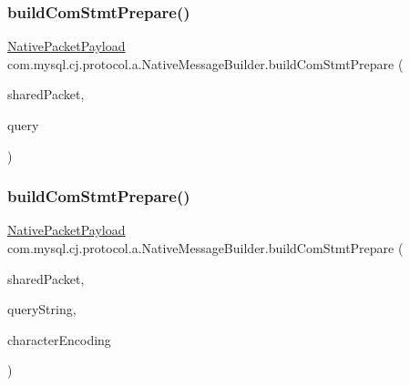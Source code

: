 \subsubsection{\texorpdfstring{build\+Com\+Stmt\+Prepare()}{buildComStmtPrepare()}\hspace{0.1cm}{\footnotesize\ttfamily [1/2]}}
{\footnotesize\ttfamily \mbox{\hyperlink{classcom_1_1mysql_1_1cj_1_1protocol_1_1a_1_1_native_packet_payload}{Native\+Packet\+Payload}} com.\+mysql.\+cj.\+protocol.\+a.\+Native\+Message\+Builder.\+build\+Com\+Stmt\+Prepare (\begin{DoxyParamCaption}\item[{\mbox{\hyperlink{classcom_1_1mysql_1_1cj_1_1protocol_1_1a_1_1_native_packet_payload}{Native\+Packet\+Payload}}}]{shared\+Packet,  }\item[{byte \mbox{[}$\,$\mbox{]}}]{query }\end{DoxyParamCaption})}

\mbox{\label{classcom_1_1mysql_1_1cj_1_1protocol_1_1a_1_1_native_message_builder_a37e0e828792aea6a797e9c2a4dc3b955}} 
\subsubsection{\texorpdfstring{build\+Com\+Stmt\+Prepare()}{buildComStmtPrepare()}\hspace{0.1cm}{\footnotesize\ttfamily [2/2]}}
{\footnotesize\ttfamily \mbox{\hyperlink{classcom_1_1mysql_1_1cj_1_1protocol_1_1a_1_1_native_packet_payload}{Native\+Packet\+Payload}} com.\+mysql.\+cj.\+protocol.\+a.\+Native\+Message\+Builder.\+build\+Com\+Stmt\+Prepare (\begin{DoxyParamCaption}\item[{\mbox{\hyperlink{classcom_1_1mysql_1_1cj_1_1protocol_1_1a_1_1_native_packet_payload}{Native\+Packet\+Payload}}}]{shared\+Packet,  }\item[{String}]{query\+String,  }\item[{String}]{character\+Encoding }\end{DoxyParamCaption})}

